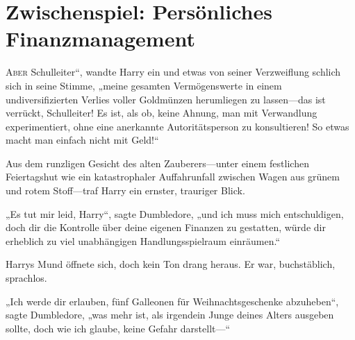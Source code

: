 \chapter{Zwischenspiel: Persönliches Finanzmanagement}
\lettrine[ante=„]{A}{ber} Schulleiter“, wandte Harry ein und etwas von seiner Verzweiflung schlich sich in seine Stimme, „meine gesamten Vermögenswerte in einem undiversifizierten Verlies voller Goldmünzen herumliegen zu lassen—das ist verrückt, Schulleiter! Es ist, als ob, keine Ahnung, man mit Verwandlung experimentiert, ohne eine anerkannte Autoritätsperson zu konsultieren! So etwas macht man einfach nicht mit Geld!“

Aus dem runzligen Gesicht des alten Zauberers—unter einem festlichen Feiertagshut wie ein katastrophaler Auffahrunfall zwischen Wagen aus grünem und rotem Stoff—traf Harry ein ernster, trauriger Blick.

„Es tut mir leid, Harry“, sagte Dumbledore, „und ich muss mich entschuldigen, doch dir die Kontrolle über deine eigenen Finanzen zu gestatten, würde dir erheblich zu viel unabhängigen Handlungsspielraum einräumen.“

Harrys Mund öffnete sich, doch kein Ton drang heraus. Er war, buchstäblich, sprachlos.

„Ich werde dir erlauben, fünf Galleonen für Weihnachtsgeschenke abzuheben“, sagte Dumbledore, „was mehr ist, als irgendein Junge deines Alters ausgeben sollte, doch wie ich glaube, keine Gefahr darstellt—“

